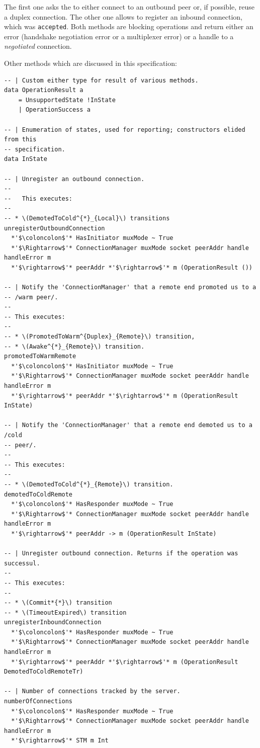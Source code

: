 The first one asks the \connmngr{} to either connect to an outbound peer or, if
possible, reuse a duplex connection. The other one allows to register an
inbound connection, which was \texttt{accepted}. Both methods are blocking
operations and return either an error (handshake negotiation error or
a multiplexer error) or a handle to a \textit{negotiated} connection.

Other methods which are discussed in this specification:

\begin{lstlisting}
-- | Custom either type for result of various methods.
data OperationResult a
    = UnsupportedState !InState
    | OperationSuccess a

-- | Enumeration of states, used for reporting; constructors elided from this
-- specification.
data InState

-- | Unregister an outbound connection.
--
--   This executes:
--
-- * \(DemotedToCold^{*}_{Local}\) transitions
unregisterOutboundConnection
  *'$\coloncolon$'* HasInitiator muxMode ~ True
  *'$\Rightarrow$'* ConnectionManager muxMode socket peerAddr handle handleError m
  *'$\rightarrow$'* peerAddr *'$\rightarrow$'* m (OperationResult ())

-- | Notify the 'ConnectionManager' that a remote end promoted us to a
-- /warm peer/.
--
-- This executes:
--
-- * \(PromotedToWarm^{Duplex}_{Remote}\) transition,
-- * \(Awake^{*}_{Remote}\) transition.
promotedToWarmRemote
  *'$\coloncolon$'* HasInitiator muxMode ~ True
  *'$\Rightarrow$'* ConnectionManager muxMode socket peerAddr handle handleError m
  *'$\rightarrow$'* peerAddr *'$\rightarrow$'* m (OperationResult InState)

-- | Notify the 'ConnectionManager' that a remote end demoted us to a /cold
-- peer/.
--
-- This executes:
--
-- * \(DemotedToCold^{*}_{Remote}\) transition.
demotedToColdRemote
  *'$\coloncolon$'* HasResponder muxMode ~ True
  *'$\Rightarrow$'* ConnectionManager muxMode socket peerAddr handle handleError m
  *'$\rightarrow$'* peerAddr -> m (OperationResult InState)

-- | Unregister outbound connection. Returns if the operation was successul.
--
-- This executes:
--
-- * \(Commit*{*}\) transition
-- * \(TimeoutExpired\) transition
unregisterInboundConnection
  *'$\coloncolon$'* HasResponder muxMode ~ True
  *'$\Rightarrow$'* ConnectionManager muxMode socket peerAddr handle handleError m
  *'$\rightarrow$'* peerAddr *'$\rightarrow$'* m (OperationResult DemotedToColdRemoteTr)

-- | Number of connections tracked by the server.
numberOfConnections
  *'$\coloncolon$'* HasResponder muxMode ~ True
  *'$\Rightarrow$'* ConnectionManager muxMode socket peerAddr handle handleError m
  *'$\rightarrow$'* STM m Int
\end{lstlisting}

